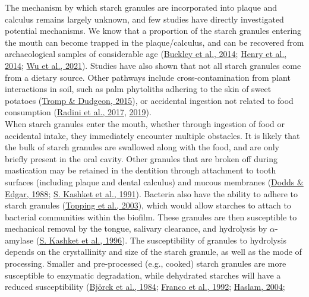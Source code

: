 \documentclass[
  letterpaper,
]{book}
\begin{document}
The mechanism by which starch granules are incorporated into plaque and
calculus remains largely unknown, and few studies have directly
investigated potential mechanisms. We know that a proportion of the
starch granules entering the mouth can become trapped in the
plaque/calculus, and can be recovered from archaeological samples of
considerable age
(\protect\hyperlink{ref-buckleyDentalCalculus2014}{Buckley et al.,
2014}; \protect\hyperlink{ref-henryNeanderthalCalculus2014}{Henry et
al., 2014}; \protect\hyperlink{ref-wuDietEarliest2021}{Wu et al.,
2021}). Studies have also shown that not all starch granules come from a
dietary source. Other pathways include cross-contamination from plant
interactions in soil, such as palm phytoliths adhering to the skin of
sweet potatoes (\protect\hyperlink{ref-trompDietaryNondietary2015}{Tromp
\& Dudgeon, 2015}), or accidental ingestion not related to food
consumption (\protect\hyperlink{ref-radiniFoodPathways2017}{Radini et
al., 2017}, \protect\hyperlink{ref-radiniMedievalWomen2019}{2019}).\\
When starch granules enter the mouth, whether through ingestion of food
or accidental intake, they immediately encounter multiple obstacles. It
is likely that the bulk of starch granules are swallowed along with the
food, and are only briefly present in the oral cavity. Other granules
that are broken off during mastication may be retained in the dentition
through attachment to tooth surfaces (including plaque and dental
calculus) and mucous membranes
(\protect\hyperlink{ref-doddsCarbohydrateRetention1988}{Dodds \& Edgar,
1988}; \protect\hyperlink{ref-kashketFoodRetention1991}{S. Kashket et
al., 1991}). Bacteria also have the ability to adhere to starch granules
(\protect\hyperlink{ref-toppingResistantStarch2003}{Topping et al.,
2003}), which would allow starches to attach to bacterial communities
within the biofilm. These granules are then susceptible to mechanical
removal by the tongue, salivary clearance, and hydrolysis by
\(\alpha\)-amylase (\protect\hyperlink{ref-kashketFoodParticles1996}{S.
Kashket et al., 1996}). The susceptibility of granules to hydrolysis
depends on the crystallinity and size of the starch granule, as well as
the mode of processing. Smaller and pre-processed (e.g., cooked) starch
granules are more susceptible to enzymatic degradation, while dehydrated
starches will have a reduced susceptibility
(\protect\hyperlink{ref-bjorckStarchProcessing1984}{Björck et al.,
1984}; \protect\hyperlink{ref-francoStarchDegradation1992}{Franco et
al., 1992};
\protect\hyperlink{ref-haslamDecompositionStarch2004}{Haslam, 2004};
\end{document}
